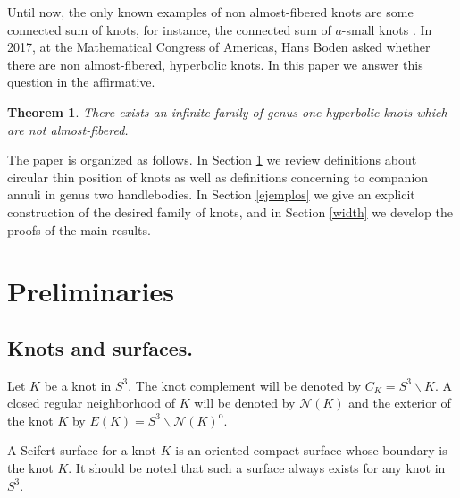 \documentclass[12pt]{amsart}
\newtheorem{teo}{Theorem}
\begin{document}
Until now, the only known examples of non almost-fibered knots are some connected sum of knots, for instance, the connected sum of $a$-small knots \cite{Fabiola2}. In 2017, at the Mathematical Congress of Americas, Hans Boden asked whether there are non almost-fibered, hyperbolic knots. In this paper we answer this question in the affirmative.


\begin{teo}
There exists an infinite family of genus one hyperbolic knots which are not almost-fibered. 
\end{teo}

The paper is organized as follows. In Section \ref{prelim} we review definitions about circular thin position of knots as well as definitions concerning to companion annuli in genus two handlebodies. In Section \ref{ejemplos} we give an explicit construction of the desired family of knots, and in Section \ref{width} we develop the proofs of the main results.

\section{Preliminaries}\label{prelim}

\subsection{Knots and surfaces.}

Let $K$ be a knot in $S^3$. The knot complement will be denoted by $C_K=S^3\backslash K$. A closed regular neighborhood of $K$ will be denoted by $\mathcal{N}(K)$ and the exterior of the knot $K$ by $E(K)=S^3\backslash \mathcal{N}(K)^{\mathrm{o}}$.

A Seifert surface for a knot $K$ is an oriented compact surface whose boundary is the knot $K$. It should be noted that such a surface always exists for any knot in $S^3$.


\end{document}
